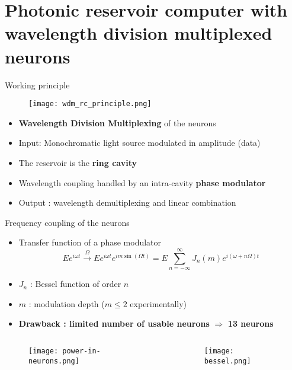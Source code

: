\section[Photonic RC with frequency multiplexed neurons]{Photonic reservoir computer with wavelength division multiplexed neurons}

\begin{frame}{Working principle}
	\begin{figure}
		\centering
		\texttt{[image: wdm\_rc\_principle.png]}
		\caption{\cite{AkroutAkram2016Pprc}}
	\end{figure}
	\begin{itemize}
		\item \textbf{Wavelength Division Multiplexing} of the neurons
		\item Input: Monochromatic light source modulated in amplitude (data)
		\item The reservoir is the \textbf{ring cavity}
		\item Wavelength coupling handled by an intra-cavity \textbf{phase modulator}
		\item Output : wavelength demultiplexing and linear combination
	\end{itemize}
\end{frame}

\begin{frame}{Frequency coupling of the neurons}
	\begin{itemize}
		\item Transfer function of a phase modulator
		\begin{equation*}
			E e^{i\omega t} \overset{\Omega}{\longrightarrow} E e^{i\omega t} e^{i m \sin{(\Omega t)}} = E \sum_{n=-\infty}^{\infty} J_n(m) e^{i(\omega+n \Omega)t}
		\end{equation*}
		\item $J_n$ : Bessel function of order $n$
		\item $m$ : modulation depth ($m \leq 2$ experimentally)
		\item \textbf{Drawback : limited number of usable neurons} $\Longrightarrow$ \textbf{13 neurons}
	\end{itemize}
	\begin{columns}
		\begin{column}{.5\textwidth}
			\begin{figure}
				\centering
				\texttt{[image: power-in-neurons.png]}
			\end{figure}
		\end{column}%
		\begin{column}{.5\textwidth}
			\begin{figure}
				\centering
				\texttt{[image: bessel.png]}
			\end{figure}
		\end{column}
	\end{columns}
\end{frame}

